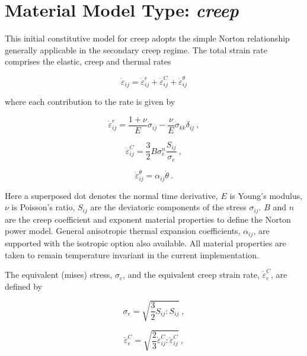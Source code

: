 \documentclass[11pt]{report}
\numberwithin{equation}{section}
\newcommand{\veps}{\varepsilon}
\newcommand{\noi}{\noindent}
\begin{document}
\section{Material Model Type: \textit{creep}}
This initial constitutive model for creep adopts the simple Norton relationship
generally  applicable in the secondary creep regime. The total strain rate comprises the
elastic, creep  and thermal rates

\begin{equation} \label{eq:strain_rate}
      \dot{\veps}_{ij} =\dot{\veps}_{ij}^e + \dot{\veps}_{ij}^C + \dot{\veps}_{ij}^\theta
 \end{equation}
 
\noi where each contribution to the rate is given by


\begin{equation} \label{eq:epsdot-elastic}
      \dot{\veps}_{ij}^e =\frac{1+\nu}{E}\dot \sigma_{ij} - \frac{\nu}{E}\dot \sigma_{kk}\delta_{ij}\ ,
\end{equation}

\begin{equation} \label{eq:epsdot-creep}
      \dot{\veps}_{ij}^C = \frac{3}{2}B \sigma_e^n \frac{S_{ij}}{\sigma_e}\ ,
\end{equation}

\begin{equation} \label{eq:epsdot-thermal}
      \dot{\veps}_{ij}^\theta = \alpha_{ij}\dot \theta\ .
\end{equation}


\noi Here a superposed dot denotes the normal time derivative, $E$ is Young's modulus, 
$\nu$ is Poisson's ratio, $S_{ij}$ are the deviatoric components
of the stress $\sigma_{ij}$. $B$ and $n$ are the creep coefficient and exponent 
material properties to define the Norton power model. General anisotropic
thermal expansion coefficients, $\alpha_{ij}$, are supported with the isotropic option also available.
All material properties are taken to remain temperature invariant in the current implementation. 

The equivalent (mises) stress, $\sigma_e$, and the equivalent creep strain rate, 
$\dot \veps_e^C$, are defined by


\begin{equation} \label{eq:mises}
      \sigma_e = \sqrt{   \textstyle\frac{3}{2}   S_{ij}:S_{ij}} \ ,
\end{equation}

\begin{equation} \label{eq:epsdot-equiv}
      \dot \veps_e^C = \sqrt{ \textstyle\frac{2}{3} \dot \veps_{ij}^C:\dot \veps_{ij}^C} \ ,
\end{equation}
\end{document}
